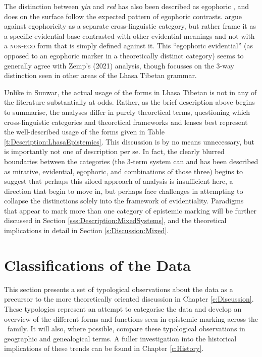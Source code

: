 The distinction between \textit{yin} and \textit{red} has also been described as egophoric \cite{EgoIntro}, and does on the surface follow the expected pattern of egophoric contrasts.  argue against egophoricity as a separate cross-linguistic category, but rather frame it as a specific evidential base contrasted with other evidential meanings and not with a \textsc{non-ego} form that is simply defined against it. This ``egophoric evidential'' (as opposed to an egophoric marker in a theoretically distinct category) seems to generally agree with Zemp's (2021) analysis, though focusses on the 3-way distinction seen in other areas of the Lhasa Tibetan grammar. 

Unlike in Sunwar, the actual usage of the forms in Lhasa Tibetan is not in any of the literature substantially at odds. Rather, as the brief description above begins to summarise, the analyses differ in purely theoretical terms, questioning which cross-linguistic categories and theoretical frameworks and lenses best represent the well-described usage of the forms given in Table \ref{t:Description:LhasaEpistemics}. This discussion is by no means unnecessary, but is importantly not one of description per se. In fact, the clearly blurred boundaries between the categories (the 3-term system can and has been described as mirative, evidential, egophoric, and combinations of those three) begins to suggest that perhaps this siloed approach of analysis is insufficient here, a direction that  begin to move in, but perhaps face challenges in attempting to collapse the distinctions solely into the framework of evidentiality. Paradigms that appear to mark more than one category of epistemic marking will be further discussed in Section \ref{sss:Description:MixedSystems}, and the theoretical implications in detail in Section \ref{s:Discussion:Mixed}.



\section{Classifications of the Data}\label{s:Description:Classifications}
This section presents a set of typological observations about the data as a precursor to the more theoretically oriented discussion in Chapter \ref{c:Discussion}. These typologies represent an attempt to categorise the data and develop an overview of the different forms and functions seen in epistemic marking across the \lfam\ family. It will also, where possible, compare these typological observations in geographic and genealogical terms. A fuller investigation into the historical implications of these trends can be found in Chapter \ref{c:History}.
